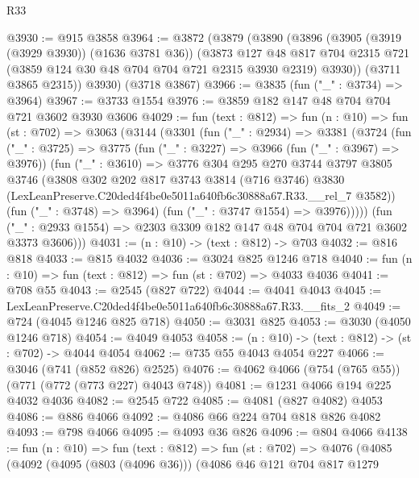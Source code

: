 \begin{lexlean}{R33}
\begin{coremodule}
@3930 := @915 @3858
@3964 := @3872
    (@3879
      (@3890
        (@3896
          (@3905 (@3919 (@3929 @3930)) (@1636 @3781 @36))
          (@3873
            @127
            @48
            @817
            @704
            @2315
            @721
            (@3859 @124 @30 @48 @704 @704 @721 @2315 @3930 @2319)
            @3930))
        (@3711 @3865 @2315))
      @3930)
    (@3718 @3867)
@3966 := @3835 (fun ("_" : @3734) => @3964)
@3967 := @3733 @1554
@3976 := @3859 @182 @147 @48 @704 @704 @721 @3602 @3930 @3606
@4029 := fun (text : @812) =>
  fun (n : @10) =>
  fun (st : @702) =>
  @3063
    (@3144
      (@3301
        (fun ("_" : @2934) =>
        @3381
          (@3724
            (fun ("_" : @3725) =>
            @3775
              (fun ("_" : @3227) => @3966 (fun ("_" : @3967) => @3976))
              (fun ("_" : @3610) =>
              @3776
                @304
                @295
                @270
                @3744
                @3797
                @3805
                @3746
                (@3808
                  @302
                  @202
                  @817
                  @3743
                  @3814
                  (@716 @3746)
                  @3830
                  (LexLeanPreserve.C20ded4f4be0e5011a640fb6c30888a67.R33.__rel_7 @3582))
                (fun ("_" : @3748) => @3964)
                (fun ("_" : @3747 @1554) => @3976)))))
        (fun ("_" : @2933 @1554) => @2303 @3309 @182 @147 @48 @704 @704 @721 @3602 @3373 @3606)))
@4031 := (n : @10) -> (text : @812) -> @703
@4032 := @816 @818
@4033 := @815 @4032
@4036 := @3024 @825 @1246 @718
@4040 := fun (n : @10) => fun (text : @812) => fun (st : @702) => @4033 @4036
@4041 := @708 @55
@4043 := @2545 (@827 @722)
@4044 := @4041 @4043
@4045 := LexLeanPreserve.C20ded4f4be0e5011a640fb6c30888a67.R33.__fits_2
@4049 := @724 (@4045 @1246 @825 @718)
@4050 := @3031 @825
@4053 := @3030 (@4050 @1246 @718)
@4054 := @4049 @4053
@4058 := (n : @10) -> (text : @812) -> (st : @702) -> @4044 @4054
@4062 := @735 @55 @4043 @4054 @227
@4066 := @3046 (@741 (@852 @826) @2525)
@4076 := @4062 @4066 (@754 (@765 @55)) (@771 (@772 (@773 @227) @4043 @748))
@4081 := @1231 @4066 @194 @225 @4032 @4036
@4082 := @2545 @722
@4085 := @4081 (@827 @4082) @4053
@4086 := @886 @4066
@4092 := @4086 @66 @224 @704 @818 @826 @4082
@4093 := @798 @4066
@4095 := @4093 @36 @826
@4096 := @804 @4066
@4138 := fun (n : @10) =>
  fun (text : @812) =>
  fun (st : @702) =>
  @4076
    (@4085
      (@4092
        (@4095 (@803 (@4096 @36)))
        (@4086
          @46
          @121
          @704
          @817
          @1279

\end{coremodule}
\end{lexlean}
